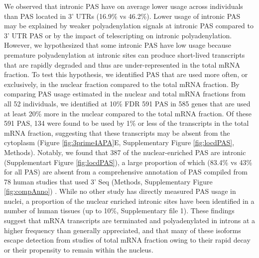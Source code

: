 We observed that intronic PAS have on average lower usage across individuals than PAS located in 3' UTRs (16.9\% vs 46.2\%). Lower usage of intronic PAS may be explained by weaker polyadenylation signals at intronic PAS compared to 3' UTR PAS or by the impact of telescripting on intronic polyadenylation. However, we hypothesized that some intronic PAS have low usage because premature polyadenylation at intronic sites can produce short-lived transcripts that are rapidly degraded and thus are under-represented in the total mRNA fraction. To test this hypothesis, we identified PAS that are used more often, or exclusively, in the nuclear fraction compared to the total mRNA fraction. By comparing PAS usage estimated in the nuclear and total mRNA fractions from all 52 individuals, we identified at 10\% FDR 591 PAS in 585 genes that are used at least 20\% more in the nuclear compared to the total mRNA fraction. Of these 591 PAS, 134 were found to be used by 1\% or less of the transcripts in the total mRNA fraction, suggesting that these transcripts may be absent from the cytoplasm (Figure \ref{fig:3prime4APA}E, Supplementary Figure \ref{fig:locdPAS}, Methods). Notably, we found that 387 of the nuclear-enriched PAS are intronic (Supplementart Figure \ref{fig:locdPAS}), a large proportion of which (83.4\% vs 43\% for all PAS) are absent from a comprehensive annotation of PAS compiled from 78 human studies that used 3' Seq (Methods, Supplementary Figure  \ref{fig:compAnno}) \citep{wang_polya_db_2018}. While no other study has directly measured PAS usage in nuclei, a proportion of the nuclear enriched intronic sites have been identified in a number of human tissues (up to 10\%, Supplementary file 1). These findings suggest that mRNA transcripts are terminated and polyadenylated in introns at a higher frequency than generally appreciated, and that many of these isoforms escape detection from studies of total mRNA fraction owing to their rapid decay or their propensity to remain within the nucleus. 

